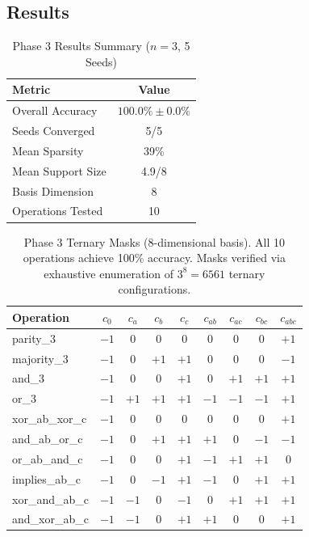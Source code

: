 \documentclass[Royal,times,sageh]{sagej}
\begin{document}
\subsection{Results}

\begin{table}[t]
\centering
\caption{Phase 3 Results Summary ($n=3$, 5 Seeds)}
\label{tab:phase3_summary}
\begin{tabular}{lc}
\toprule
\textbf{Metric} & \textbf{Value} \\
\midrule
Overall Accuracy & $100.0\% \pm 0.0\%$ \\
Seeds Converged & 5/5 \\
Mean Sparsity & 39\% \\
Mean Support Size & 4.9/8 \\
Basis Dimension & 8 \\
Operations Tested & 10 \\
\bottomrule
\end{tabular}
\end{table}

\begin{table}[t]
\centering
\caption{Phase 3 Ternary Masks (8-dimensional basis). All 10 operations achieve 100\% accuracy. Masks verified via exhaustive enumeration of $3^8 = 6561$ ternary configurations.}
\label{tab:phase3_masks}
\small
\begin{tabular}{lcccccccc}
\toprule
\textbf{Operation} & $c_0$ & $c_a$ & $c_b$ & $c_c$ & $c_{ab}$ & $c_{ac}$ & $c_{bc}$ & $c_{abc}$ \\
\midrule
parity\_3 & $-1$ & $0$ & $0$ & $0$ & $0$ & $0$ & $0$ & $+1$ \\
majority\_3 & $-1$ & $0$ & $+1$ & $+1$ & $0$ & $0$ & $0$ & $-1$ \\
and\_3 & $-1$ & $0$ & $0$ & $+1$ & $0$ & $+1$ & $+1$ & $+1$ \\
or\_3 & $-1$ & $+1$ & $+1$ & $+1$ & $-1$ & $-1$ & $-1$ & $+1$ \\
xor\_ab\_xor\_c & $-1$ & $0$ & $0$ & $0$ & $0$ & $0$ & $0$ & $+1$ \\
and\_ab\_or\_c & $-1$ & $0$ & $+1$ & $+1$ & $+1$ & $0$ & $-1$ & $-1$ \\
or\_ab\_and\_c & $-1$ & $0$ & $0$ & $+1$ & $-1$ & $+1$ & $+1$ & $0$ \\
implies\_ab\_c & $-1$ & $0$ & $-1$ & $+1$ & $-1$ & $0$ & $+1$ & $+1$ \\
xor\_and\_ab\_c & $-1$ & $-1$ & $0$ & $-1$ & $0$ & $+1$ & $+1$ & $+1$ \\
and\_xor\_ab\_c & $-1$ & $-1$ & $0$ & $+1$ & $+1$ & $0$ & $0$ & $+1$ \\
\bottomrule
\end{tabular}
\end{table}
\end{document}
